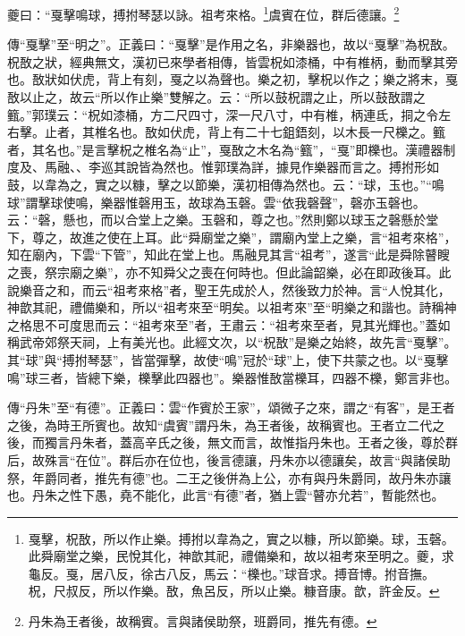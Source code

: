 夔曰：“戛擊鳴球，搏拊琴瑟以詠。祖考來格。\footnote{戛擊，柷敔，所以作止樂。搏拊以韋為之，實之以糠，所以節樂。球，玉磬。此舜廟堂之樂，民悅其化，神歆其祀，禮備樂和，故以祖考來至明之。夔，求龜反。戛，居八反，徐古八反，馬云：“櫟也。”球音求。搏音博。拊音撫。柷，尺叔反，所以作樂。敔，魚呂反，所以止樂。糠音康。歆，許金反。}虞賓在位，群后德讓。\footnote{丹朱為王者後，故稱賓。言與諸侯助祭，班爵同，推先有德。}


{\noindent\zhuan{}\fzbyks 傳“戛擊”至“明之”。正義曰：“戛擊”是作用之名，非樂器也，故以“戛擊”為柷敔。柷敔之狀，經典無文，漢初已來學者相傳，皆雲柷如漆桶，中有椎柄，動而擊其旁也。敔狀如伏虎，背上有刻，戛之以為聲也。樂之初，擊柷以作之；樂之將末，戛敔以止之，故云“所以作止樂”雙解之。云：“所以鼓柷謂之止，所以鼓敔謂之籈。”郭璞云：“柷如漆桶，方二尺四寸，深一尺八寸，中有椎，柄連氐，挏之令左右擊。止者，其椎名也。敔如伏虎，背上有二十七鉏鋙刻，以木長一尺櫟之。籈者，其名也。”是言擊柷之椎名為“止”，戛敔之木名為“籈”，“戛”即櫟也。漢禮器制度及、馬融、、李巡其說皆為然也。惟郭璞為詳，據見作樂器而言之。搏拊形如鼓，以韋為之，實之以糠，擊之以節樂，漢初相傳為然也。云：“球，玉也。”“鳴球”謂擊球使鳴，樂器惟磬用玉，故球為玉磬。雲“依我磬聲”，磬亦玉磬也。云：“磬，懸也，而以合堂上之樂。玉磬和，尊之也。”然則鄭以球玉之磬懸於堂下，尊之，故進之使在上耳。此“舜廟堂之樂”，謂廟內堂上之樂，言“祖考來格”，知在廟內，下雲“下管”，知此在堂上也。馬融見其言“祖考”，遂言“此是舜除瞽瞍之喪，祭宗廟之樂”，亦不知舜父之喪在何時也。但此論韶樂，必在即政後耳。此說樂音之和，而云“祖考來格”者，聖王先成於人，然後致力於神。言“人悅其化，神歆其祀，禮備樂和，所以“祖考來至“明矣。以祖考來”至“明樂之和諧也。詩稱神之格思不可度思而云：“祖考來至”者，王肅云：“祖考來至者，見其光輝也。”蓋如稱武帝郊祭天祠，上有美光也。此經文次，以“柷敔”是樂之始終，故先言“戛擊”。其“球”與“搏拊琴瑟”，皆當彈擊，故使“鳴”冠於“球”上，使下共蒙之也。以“戛擊鳴”球三者，皆總下樂，櫟擊此四器也”。樂器惟敔當櫟耳，四器不櫟，鄭言非也。 \par}

{\noindent\zhuan{}\fzbyks 傳“丹朱”至“有德”。正義曰：雲“作賓於王家”，頌微子之來，謂之“有客”，是王者之後，為時王所賓也。故知“虞賓”謂丹朱，為王者後，故稱賓也。王者立二代之後，而獨言丹朱者，蓋高辛氏之後，無文而言，故惟指丹朱也。王者之後，尊於群后，故殊言“在位”。群后亦在位也，後言德讓，丹朱亦以德讓矣，故言“與諸侯助祭，年爵同者，推先有德”也。二王之後併為上公，亦有與丹朱爵同，故丹朱亦讓也。丹朱之性下愚，堯不能化，此言“有德”者，猶上雲“瞽亦允若”，暫能然也。 \par}

